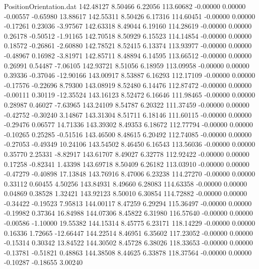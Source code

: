 \begin{filecontents}{PositionOrientation.dat}
 142.48127    8.50466    6.22056   113.60682   -0.00000    0.00000   -0.00557   -0.65980   13.88617
 142.55311    8.50426    6.17316   114.60451   -0.00000    0.00000   -0.17261    0.23036   -3.97567
 142.63318    8.49044    6.19160   114.28619   -0.00000    0.00000    0.26178   -0.50512   -1.91165
 142.70518    8.50929    6.15523   114.14854   -0.00000    0.00000    0.18572   -0.26861   -2.60880
 142.78521    8.52415    6.13374   113.93977   -0.00000    0.00000   -0.48967    0.16982   -3.81971
 142.85711    8.48894    6.14595   113.66512   -0.00000    0.00000    0.26991    0.54487   -7.06105
 142.93721    8.51056    6.18959   113.09958   -0.00000    0.00000    0.39336   -0.37046  -12.90166
 143.00917    8.53887    6.16293   112.17109   -0.00000    0.00000   -0.17576   -0.22696    8.79300
 143.08919    8.52480    6.14476   112.87472   -0.00000    0.00000   -0.00111    0.30119  -12.35524
 143.16123    8.52472    6.16646   111.98465   -0.00000    0.00000    0.28987    0.46027   -7.63965
 143.24109    8.54787    6.20322   111.37459   -0.00000    0.00000   -0.42752   -0.30240    3.14867
 143.31304    8.51711    6.18146   111.60115   -0.00000    0.00000   -0.29476    0.06577   14.71336
 143.39302    8.49353    6.18672   112.77794   -0.00000    0.00000   -0.10265    0.25285   -0.51516
 143.46500    8.48615    6.20492   112.74085   -0.00000    0.00000   -0.27053   -0.49349   10.24106
 143.54502    8.46450    6.16543   113.56036   -0.00000    0.00000    0.35770    2.25331   -8.82917
 143.61707    8.49027    6.32778   112.92422   -0.00000    0.00000    0.17258   -0.82341    1.43398
 143.69718    8.50409    6.26182   113.03910   -0.00000    0.00000   -0.47279   -0.40898   17.13848
 143.76916    8.47006    6.23238   114.27270   -0.00000    0.00000    0.33112    0.60455    4.50256
 143.84931    8.49660    6.28083   114.63358   -0.00000    0.00000    0.04869    0.38528    1.32421
 143.92123    8.50010    6.30854   114.72882   -0.00000    0.00000   -0.34422   -0.19523    7.95813
 144.00117    8.47259    6.29294   115.36497   -0.00000    0.00000   -0.19982    0.37364   16.84988
 144.07306    8.45822    6.31980   116.57640   -0.00000    0.00000   -0.00586   -1.10000   19.55382
 144.15314    8.45775    6.23171   118.14229   -0.00000    0.00000    0.16336    1.72665  -12.66447
 144.22514    8.46951    6.35602   117.23052   -0.00000    0.00000   -0.15314    0.30342   13.84522
 144.30502    8.45728    6.38026   118.33653   -0.00000    0.00000   -0.13781   -0.51821    0.48863
 144.38508    8.44625    6.33878   118.37564   -0.00000    0.00000   -0.10287   -0.18655    3.00240

\end{filecontents}
